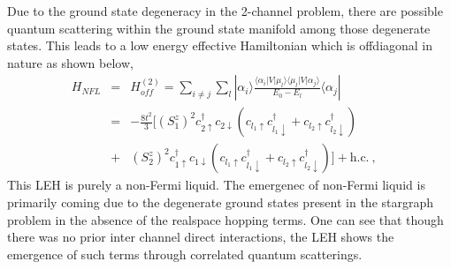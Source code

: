 \documentclass[reprint,prb,superscriptaddress]{revtex4-1}
\begin{document}
Due to the ground state degeneracy in the 2-channel problem, there are possible quantum scattering within the ground state manifold among those degenerate states. This leads to a low energy effective Hamiltonian which is offdiagonal in nature as shown below,
\begin{eqnarray}
H_{NFL}&=&H^{(2)}_{off} = \sum_{i\neq j} \sum_l |\alpha_i\rangle \frac{\langle \alpha_i  | V| \mu_l \rangle \langle \mu_l  | V| \alpha_j \rangle}{E_0-E_{l}}\langle \alpha_j | \nonumber\\
&=& -\frac{8t^2}{3} [ (S_1^z)^2 c_{2\uparrow}^{\dagger}c_{2\downarrow}  (  c_{l_1\uparrow}c_{l_1\downarrow}^{\dagger} +  c_{l_2\uparrow}c_{l_2\downarrow}^{\dagger}  ) \nonumber\\
&+& (S_2^z)^2 c_{1\uparrow}^{\dagger}c_{1\downarrow}  (  c_{l_1\uparrow}c_{l_1\downarrow}^{\dagger} +  c_{l_2\uparrow}c_{l_2\downarrow}^{\dagger}  ) ] + \textrm{h.c.} ~,~~~~
\label{eq:hamiltonian_NFL}
\end{eqnarray}
This LEH is purely a non-Fermi liquid. The emergenec of non-Fermi liquid is primarily coming due to the degenerate ground states present in the stargraph problem in the absence of the realspace hopping terms. One can see that though there was no prior inter channel direct interactions, the LEH shows the emergence of such terms through correlated quantum scatterings. 
\end{document}
